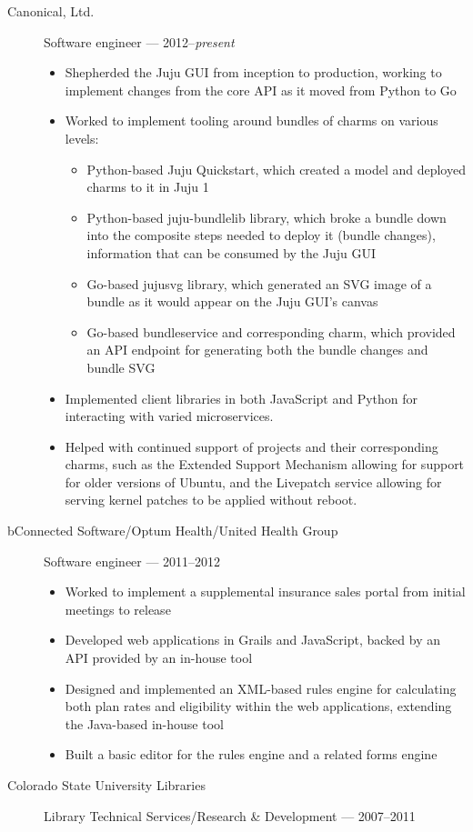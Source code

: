 \begin{description}
\item[Canonical, Ltd.]
Software engineer --- 2012--\emph{present}

\begin{itemize}
\tightlist
\item
  Shepherded the Juju GUI from inception to production, working to implement changes from the core API as it moved from Python to Go
\item
  Worked to implement tooling around bundles of charms on various levels:

  \begin{itemize}
  \tightlist
  \item
    Python-based Juju Quickstart, which created a model and deployed charms to it in Juju 1
  \item
    Python-based juju-bundlelib library, which broke a bundle down into the composite steps needed to deploy it (bundle changes), information that can be consumed by the Juju GUI
  \item
    Go-based jujusvg library, which generated an SVG image of a bundle as it would appear on the Juju GUI's canvas
  \item
    Go-based bundleservice and corresponding charm, which provided an API endpoint for generating both the bundle changes and bundle SVG
  \end{itemize}
  \item
    Implemented client libraries in both JavaScript and Python for interacting with varied microservices.
  \item
    Helped with continued support of projects and their corresponding charms, such as the Extended Support Mechanism allowing for support for older versions of Ubuntu, and the Livepatch service allowing for serving kernel patches to be applied without reboot.
\end{itemize}
\item[bConnected Software/Optum Health/United Health Group]
Software engineer --- 2011--2012

\begin{itemize}
\tightlist
\item
  Worked to implement a supplemental insurance sales portal from initial meetings to release
\item
  Developed web applications in Grails and JavaScript, backed by an API provided by an in-house tool
\item
  Designed and implemented an XML-based rules engine for calculating both plan rates and eligibility within the web applications, extending the Java-based in-house tool
\item
  Built a basic editor for the rules engine and a related forms engine
\end{itemize}
\item[Colorado State University Libraries]
Library Technical Services/Research \& Development --- 2007--2011


\end{description}
